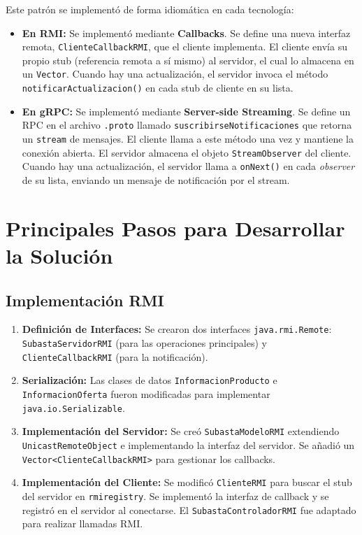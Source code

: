 \documentclass[11pt, a4paper]{article}
\begin{document}
Este patrón se implementó de forma idiomática en cada tecnología:
\begin{itemize}
    \item \textbf{En RMI:} Se implementó mediante \textbf{Callbacks}. Se define una nueva interfaz remota, \texttt{ClienteCallbackRMI}, que el cliente implementa. El cliente envía su propio stub (referencia remota a sí mismo) al servidor, el cual lo almacena en un \texttt{Vector}. Cuando hay una actualización, el servidor invoca el método \texttt{notificarActualizacion()} en cada stub de cliente en su lista.
    \item \textbf{En gRPC:} Se implementó mediante \textbf{Server-side Streaming}. Se define un RPC en el archivo \texttt{.proto} llamado \texttt{suscribirseNotificaciones} que retorna un \texttt{stream} de mensajes. El cliente llama a este método una vez y mantiene la conexión abierta. El servidor almacena el objeto \texttt{StreamObserver} del cliente. Cuando hay una actualización, el servidor llama a \texttt{onNext()} en cada \textit{observer} de su lista, enviando un mensaje de notificación por el stream.
\end{itemize}

\section{Principales Pasos para Desarrollar la Solución}
\label{sec:pasos}

\subsection{Implementación RMI}
\begin{enumerate}
    \item \textbf{Definición de Interfaces:} Se crearon dos interfaces \texttt{java.rmi.Remote}: \texttt{SubastaServidorRMI} (para las operaciones principales) y \texttt{ClienteCallbackRMI} (para la notificación).
    \item \textbf{Serialización:} Las clases de datos \texttt{InformacionProducto} e \texttt{InformacionOferta} fueron modificadas para implementar \texttt{java.io.Serializable}.
    \item \textbf{Implementación del Servidor:} Se creó \texttt{SubastaModeloRMI} extendiendo \texttt{UnicastRemoteObject} e implementando la interfaz del servidor. Se añadió un \texttt{Vector<ClienteCallbackRMI>} para gestionar los callbacks.
    \item \textbf{Implementación del Cliente:} Se modificó \texttt{ClienteRMI} para buscar el stub del servidor en \texttt{rmiregistry}. Se implementó la interfaz de callback y se registró en el servidor al conectarse. El \texttt{SubastaControladorRMI} fue adaptado para realizar llamadas RMI.
\end{enumerate}
\end{document}
